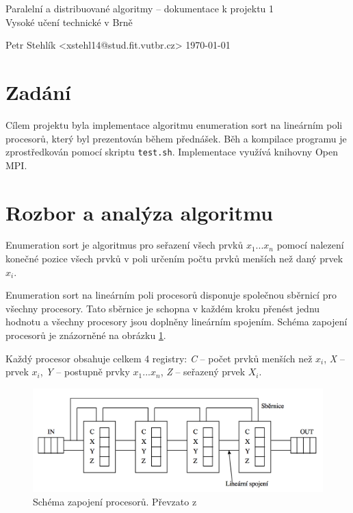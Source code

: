 \documentclass[11pt,a4paper]{article}
\begin{document}
\begin{center}
	\LARGE{Paralelní a distribuované algoritmy -- dokumentace k projektu 1}\\
	\large{Vysoké učení technické v Brně}
	\vspace{0.2cm}

	Petr Stehlík <xstehl14@stud.fit.vutbr.cz>     \today

\end{center}

\section{Zadání}

Cílem projektu byla implementace algoritmu enumeration sort na lineárním poli procesorů, který byl prezentován během přednášek. Běh a kompilace programu je zprostředkován pomocí skriptu \texttt{test.sh}. Implementace využívá knihovny Open MPI\cite{bib:openmpi}.


\section{Rozbor a analýza algoritmu}

Enumeration sort je algoritmus pro seřazení všech prvků $x_1...x_n$ pomocí nalezení konečné pozice všech prvků v poli určením počtu prvků menších než daný prvek $x_i$.

Enumeration sort na lineárním poli procesorů disponuje společnou sběrnicí pro všechny procesory. Tato sběrnice je schopna v každém kroku přenést jednu hodnotu a všechny procesory jsou doplněny lineárním spojením. Schéma zapojení procesorů je znázorněné na obrázku \ref{schema}.

Každý procesor obsahuje celkem 4 registry: \textit{C} -- počet prvků menších než $x_i$, \textit{X} -- prvek $x_i$, \textit{Y} -- postupně prvky $x_1 ... x_n$, \textit{Z} -- seřazený prvek $X_i$.

\begin{figure}[h]
    \includegraphics[width=0.7\linewidth]{schema}
    \centering
    \caption{Schéma zapojení procesorů. Převzato z \cite{bib:schema}}
    \label{schema}
\end{figure}
\end{document}
